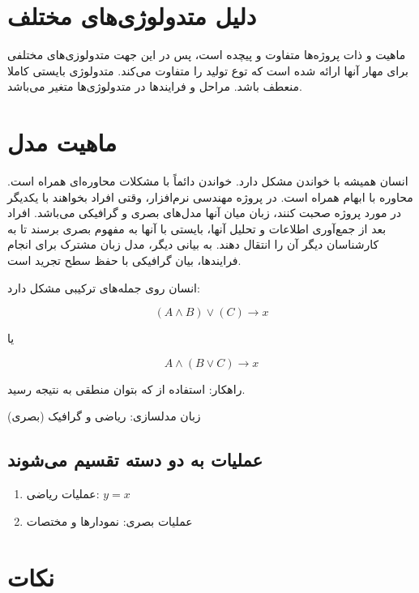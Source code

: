 \section{دلیل متدولوژی‌های مختلف}

ماهیت و ذات پروژه‌ها متفاوت و پیچده‌ است، پس در این جهت متدولوزی‌های مختلفی برای
مهار آنها ارائه شده است که توع تولید را متفاوت می‌کند. متدولوژی بایستی کاملا
منعطف باشد. مراحل و فرایند‌ها در متدولوژی‌ها متغیر می‌باشد.

\section{ماهیت مدل}

انسان همیشه با خواندن مشکل دارد. خواندن دائماً با مشکلات محاوره‌ای همراه است.
محاوره با ابهام همراه است. در پروژه مهندسی نرم‌افزار، وقتی افراد بخواهند با
یکدیگر در مورد پروژه صحبت کنند، زبان میان آنها مدل‌های بصری و گرافیکی می‌باشد.
افراد بعد از جمع‌آوری اطلاعات و تحلیل آنها، بایستی با آنها به مفهوم بصری برسند
تا به کارشناسان دیگر آن را انتقال دهند. به بیانی دیگر، مدل زبان مشترک برای انجام
فرایند‌ها، بیان گرافیکی با حفظ سطح تجرید است.

انسان روی جمله‌های ترکیبی مشکل دارد: 

\begin{equation}
  (A \wedge  B)\vee (C) \rightarrow x
\end{equation}

یا

\begin{equation}
  A \wedge (B \vee C) \rightarrow x
\end{equation}

راهکار: استفاده از  که بتوان منطقی به نتیجه رسید.

زبان مدلسازی: ریاضی و گرافیک (بصری)

\subsection*{عملیات به دو دسته تقسیم می‌شوند}

\begin{enumerate}
  \item عملیات ریاضی: $y = x$
  \item عملیات بصری: نمودار‌ها و مختصات
\end{enumerate}

\section*{نکات}

